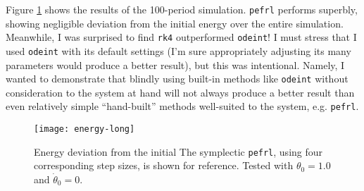 \documentclass[11pt, a4paper]{article}
\begin{document}
Figure \ref{newton:fig:energy-long} shows the results of the 100-period simulation. \texttt{pefrl} performs superbly, showing negligible deviation from the initial energy over the entire simulation. Meanwhile, I was surprised to find \texttt{rk4} outperformed \texttt{odeint}! I must stress that I used \texttt{odeint} with its default settings (I'm sure appropriately adjusting its many parameters would produce a better result), but this was intentional. Namely, I wanted to demonstrate that blindly using built-in methods like \texttt{odeint} without consideration to the system at hand will not always produce a better result than even relatively simple ``hand-built'' methods well-suited to the system, e.g. \texttt{pefrl}.

\begin{figure}[htb!]
\centering
\texttt{[image: energy-long]}

\caption{Energy deviation from the initial The symplectic \texttt{pefrl}, using four corresponding step sizes, is shown for reference. Tested with $ \theta_{0} = 1.0 $ and $ \dot{\theta}_{0} = 0 $.}

\label{newton:fig:energy-long}
\end{figure}
\end{document}
